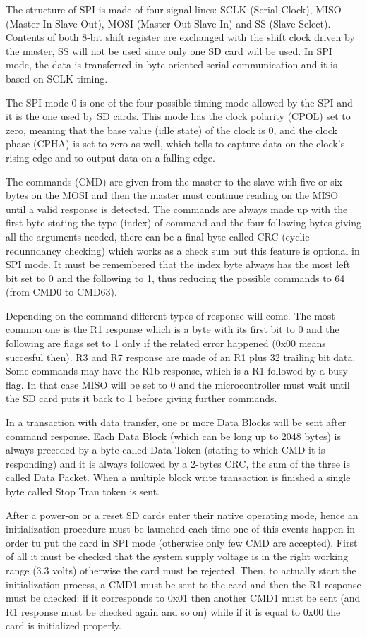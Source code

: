\documentclass[a4paper,oneside,12pt]{article}
\begin{document}
The structure of SPI is made of four signal lines: SCLK (Serial Clock), MISO (Master-In Slave-Out), MOSI (Master-Out Slave-In) and SS (Slave Select). Contents of both 8-bit shift register are exchanged with the shift clock driven by the master, SS will not be used since only one SD card will be used. In SPI mode, the data is transferred in byte oriented serial communication and it is based on SCLK timing.

The SPI mode 0 is one of the four possible timing mode allowed by the SPI and it is the one used by SD cards. This mode has the clock polarity (CPOL) set to zero, meaning that the base value (idle state) of the clock is 0, and the clock phase (CPHA) is set to zero as well, which tells to capture data on the clock's rising edge and to output data on a falling edge.

The commands (CMD) are given from the master to the slave with five or six bytes on the MOSI and then the master must continue reading on the MISO until a valid response is detected. The commands are always made up with the first byte stating the type (index) of command and the four following bytes giving all the arguments needed, there can be a final byte called CRC (cyclic redunndancy checking) which works as a check sum but this feature is optional in SPI mode. It must be remembered that the index byte always has the most left bit set to 0 and the following to 1, thus reducing the possible commands to 64 (from CMD0 to CMD63).

Depending on the command different types of response will come. The most common one is the R1 response which is a byte with its first bit to 0 and the following are flags set to 1 only if the related error happened (0x00 means succesful then). R3 and R7 response are made of an R1 plus 32 trailing bit data. Some commands may have the R1b response, which is a R1 followed by a busy flag. In that case MISO will be set to 0 and the microcontroller must wait until the SD card puts it back to 1 before giving further commands.

In a transaction with data transfer, one or more Data Blocks will be sent after command response. Each Data Block (which can be long up to 2048 bytes) is always preceded by a byte called Data Token (stating to which CMD it is responding) and it is always followed by a 2-bytes CRC, the sum of the three is called Data Packet. When a multiple block write transaction is finished a single byte called Stop Tran token is sent.

After a power-on or a reset SD cards enter their native operating mode, hence an initialization procedure must be launched each time one of this events happen in order tu put the card in SPI mode (otherwise only few CMD are accepted). First of all it must be checked that the system supply voltage is in the right working range (3.3 volts) otherwise the card must be rejected. Then, to actually start the initialization process, a CMD1 must be sent to the card and then the R1 response must be checked: if it corresponds to 0x01 then another CMD1 must be sent (and R1 response must be checked again and so on) while if it is equal to 0x00 the card is initialized properly.
\end{document}
